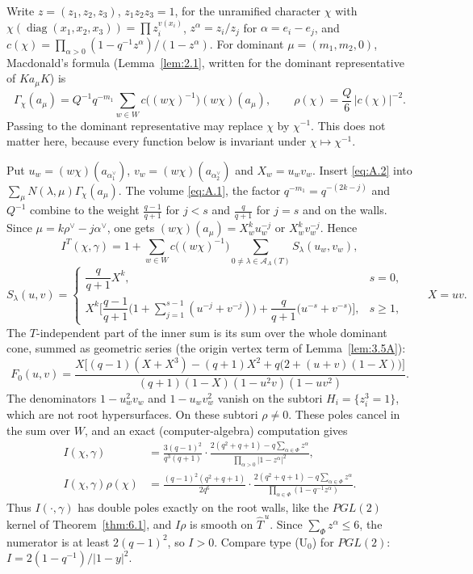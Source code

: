 \documentclass[12pt,letterpaper]{article}
\numberwithin{equation}{section}
\theoremstyle{plain}
\theoremstyle{remark}
\theoremstyle{plain}
\theoremstyle{definition}
\theoremstyle{remark}
\theoremstyle{remark}
\newcommand{\cA}{\mathcal{A}}
\newcommand{\Thu}{\widehat{T}^{\,u}}
\DeclareMathOperator{\diag}{diag}
\begin{document}
Write $z=(z_1,z_2,z_3)$, $z_1z_2z_3=1$, for the unramified character $\chi$ with $\chi(\diag(x_1,x_2,x_3))=\prod z_i^{v(x_i)}$, $z^\alpha=z_i/z_j$ for $\alpha=e_i-e_j$, and $c(\chi)=\prod_{\alpha>0}(1-q^{-1}z^\alpha)/(1-z^\alpha)$. For dominant $\mu=(m_1,m_2,0)$, Macdonald's formula (Lemma~\ref{lem:2.1}, written for the dominant representative of $Ka_\mu K$) is
\begin{equation}\label{eq:A.3}
\Gamma_\chi(a_\mu)=Q^{-1}q^{-m_1}\sum_{w\in W}c\big((w\chi)^{-1}\big)(w\chi)(a_\mu),\qquad \rho(\chi)=\frac Q6\,|c(\chi)|^{-2}.
\end{equation}
Passing to the dominant representative may replace $\chi$ by $\chi^{-1}$. This does not matter here, because every function below is invariant under $\chi\mapsto\chi^{-1}$.

Put $u_w=(w\chi)(a_{\alpha_1^\vee})$, $v_w=(w\chi)(a_{\alpha_2^\vee})$ and $X_w=u_wv_w$. Insert \eqref{eq:A.2} into $\sum_\mu N(\lambda,\mu)\Gamma_\chi(a_\mu)$. The volume \eqref{eq:A.1}, the factor $q^{-m_1}=q^{-(2k-j)}$ and $Q^{-1}$ combine to the weight $\frac{q-1}{q+1}$ for $j<s$ and $\frac q{q+1}$ for $j=s$ and on the walls. Since $\mu=k\rho^\vee-j\alpha^\vee$, one gets $(w\chi)(a_\mu)=X_w^k u_w^{-j}$ or $X_w^kv_w^{-j}$. Hence
\[
I^T(\chi,\gamma)=1+\sum_{w\in W}c\big((w\chi)^{-1}\big)\sum_{0\ne\lambda\in\cA_A(T)}S_\lambda(u_w,v_w),
\]
\[
S_\lambda(u,v)=\begin{cases}\dfrac{q}{q+1}X^k,& s=0,\\[1.5ex]
X^k\Big[\dfrac{q-1}{q+1}\Big(1+\sum_{j=1}^{s-1}(u^{-j}+v^{-j})\Big)+\dfrac q{q+1}\big(u^{-s}+v^{-s}\big)\Big],& s\ge1,\end{cases}\qquad X=uv.
\]
The $T$-independent part of the inner sum is its sum over the whole dominant cone, summed as geometric series (the origin vertex term of Lemma~\ref{lem:3.5A}):
\[
F_0(u,v)=\frac{X\big[(q-1)(X+X^3)-(q+1)X^2+q\big(2+(u+v)(1-X)\big)\big]}{(q+1)(1-X)(1-u^2v)(1-uv^2)}.
\]
The denominators $1-u_w^2v_w$ and $1-u_wv_w^2$ vanish on the subtori $H_i=\{z_i^3=1\}$, which are not root hypersurfaces. On these subtori $\rho\ne0$. These poles cancel in the sum over $W$, and an exact (computer-algebra) computation gives
\begin{equation}\label{eq:A.4}
\begin{aligned}
I(\chi,\gamma)&=\frac{3(q-1)^2}{q^3(q+1)}\cdot\frac{2(q^2+q+1)-q\sum_{\alpha\in\Phi}z^\alpha}{\prod_{\alpha>0}|1-z^\alpha|^2},\\
I(\chi,\gamma)\rho(\chi)&=\frac{(q-1)^2(q^2+q+1)}{2q^6}\cdot\frac{2(q^2+q+1)-q\sum_{\alpha\in\Phi}z^\alpha}{\prod_{\alpha\in\Phi}(1-q^{-1}z^\alpha)}.
\end{aligned}
\end{equation}
Thus $I(\cdot,\gamma)$ has double poles exactly on the root walls, like the $PGL(2)$ kernel of Theorem~\ref{thm:6.1}, and $I\rho$ is smooth on $\Thu$. Since $\sum_\Phi z^\alpha\le6$, the numerator is at least $2(q-1)^2$, so $I>0$. Compare type (U$_0$) for $PGL(2)$: $I=2(1-q^{-1})/|1-y|^2$.
\end{document}
